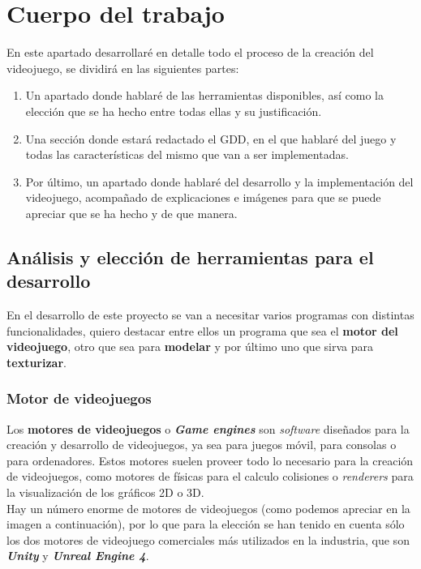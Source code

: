 \chapter{Cuerpo del trabajo}

En este apartado desarrollaré en detalle todo el proceso de la creación del videojuego, se dividirá en las siguientes partes:

\begin{enumerate}
	\item Un apartado donde hablaré de las herramientas disponibles, así como la elección que se ha hecho entre todas ellas y su justificación.
	\item Una sección donde estará redactado el \ac{GDD}, en el que hablaré del juego y todas las características del mismo que van a ser implementadas.
	\item Por último, un apartado donde hablaré del desarrollo y la implementación del videojuego, acompañado de explicaciones e imágenes para que se puede apreciar que se ha hecho y de que manera.

\end{enumerate}

\section{Análisis y elección de herramientas para el desarrollo}

En el desarrollo de este proyecto se van a necesitar varios programas con distintas funcionalidades, quiero destacar entre ellos un programa que sea el \textbf{motor del videojuego}, otro que sea para \textbf{modelar} y por último uno que sirva para \textbf{texturizar}.

\subsection{Motor de videojuegos}

Los \textbf{motores de videojuegos} o \textbf{\textit{Game engines}} son \textit{software} diseñados para la creación y desarrollo de videojuegos, ya sea para juegos móvil, para consolas o para ordenadores. Estos motores suelen proveer todo lo necesario para la creación de videojuegos, como motores de físicas para el calculo colisiones o \textit{renderers} para la visualización de los gráficos 2D o 3D.
\\



Hay un número enorme de motores de videojuegos (como podemos apreciar en la imagen a continuación), por lo que para la elección se han tenido en cuenta sólo los dos motores de videojuego comerciales más utilizados en la industria, que son \textbf{\textit{Unity}} y \textbf{\textit{Unreal Engine 4}}.
	
